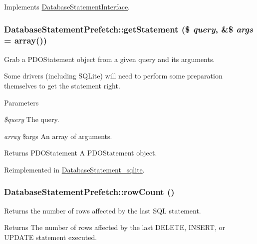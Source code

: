 Implements \hyperlink{interfaceDatabaseStatementInterface_a2c248a565c623713d8e5ddf0ba83880d}{DatabaseStatementInterface}.\hypertarget{classDatabaseStatementPrefetch_a08ef92c5108225cdd2e02885ca2aeea4}{
\subsubsection[{getStatement}]{\setlength{\rightskip}{0pt plus 5cm}DatabaseStatementPrefetch::getStatement (\$ {\em query}, \/  \&\$ {\em args} = {\ttfamily array()})}}
\label{classDatabaseStatementPrefetch_a08ef92c5108225cdd2e02885ca2aeea4}
Grab a PDOStatement object from a given query and its arguments.

Some drivers (including SQLite) will need to perform some preparation themselves to get the statement right.


\begin{DoxyParams}{Parameters}
\item[{\em \$query}]The query. \item[{\em array}]\$args An array of arguments. \end{DoxyParams}
\begin{DoxyReturn}{Returns}
PDOStatement A PDOStatement object. 
\end{DoxyReturn}


Reimplemented in \hyperlink{classDatabaseStatement__sqlite_a2d397baba57238e6797e59e9c36943b3}{DatabaseStatement\_\-sqlite}.\hypertarget{classDatabaseStatementPrefetch_a03f64ac0f61a386a4f5a87540d254fa1}{
\subsubsection[{rowCount}]{\setlength{\rightskip}{0pt plus 5cm}DatabaseStatementPrefetch::rowCount ()}}
\label{classDatabaseStatementPrefetch_a03f64ac0f61a386a4f5a87540d254fa1}
Returns the number of rows affected by the last SQL statement.

\begin{DoxyReturn}{Returns}
The number of rows affected by the last DELETE, INSERT, or UPDATE statement executed. 
\end{DoxyReturn}


